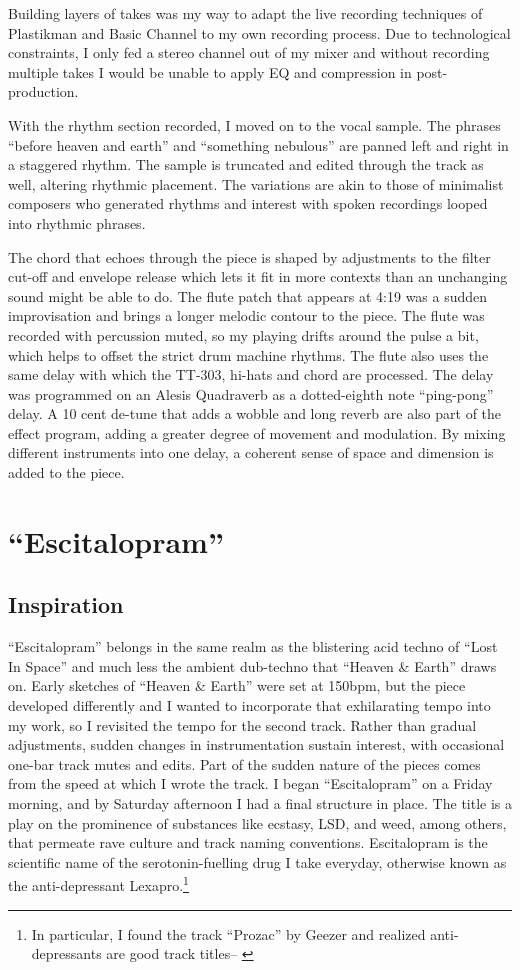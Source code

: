 \documentclass[12pt,twoside]{reedthesis}
\begin{document}
Building layers of takes was my way to adapt the live recording techniques of Plastikman and Basic Channel to my own recording process. Due to technological constraints, I only fed a stereo channel out of my mixer and without recording multiple takes I would be unable to apply EQ and compression in post-production. 

With the rhythm section recorded, I moved on to the vocal sample. The phrases ``before heaven and earth'' and ``something nebulous'' are panned left and right in a staggered rhythm. The sample is truncated and edited through the track as well, altering rhythmic placement. The variations are akin to those of minimalist composers who generated rhythms and interest with spoken recordings looped into rhythmic phrases.

The chord that echoes through the piece is shaped by adjustments to the filter cut-off and envelope release which lets it fit in more contexts than an unchanging sound might be able to do. The flute patch that appears at 4:19 was a sudden improvisation and brings a longer melodic contour to the piece. The flute was recorded with percussion muted, so my playing drifts around the pulse a bit, which helps to offset the strict drum machine rhythms. The flute also uses the same delay with which the TT-303, hi-hats and chord are processed. The delay was programmed on an Alesis Quadraverb as a dotted-eighth note ``ping-pong'' delay. A 10 cent de-tune that adds a wobble and long reverb are also part of the effect program, adding a greater degree of movement and modulation. By mixing different instruments into one delay, a coherent sense of space and dimension is added to the piece. 

\section{``Escitalopram''}

\subsection{Inspiration}

``Escitalopram'' belongs in the same realm as the blistering acid techno of ``Lost In Space'' and much less the ambient dub-techno that ``Heaven {\&} Earth'' draws on. Early sketches of ``Heaven {\&} Earth'' were set at 150bpm, but the piece developed differently and I wanted to incorporate that exhilarating tempo into my work, so I revisited the tempo for the second track. Rather than gradual adjustments, sudden changes in instrumentation sustain interest, with occasional one-bar track mutes and edits. Part of the sudden nature of the pieces comes from the speed at which I wrote the track. I began ``Escitalopram'' on a Friday morning, and by Saturday afternoon I had a final structure in place. The title is a play on the prominence of substances like ecstasy, LSD, and weed, among others, that permeate rave culture and track naming conventions. Escitalopram is the scientific name of the serotonin-fuelling drug I take everyday, otherwise known as the anti-depressant Lexapro.\footnote{In particular, I found the track ``Prozac'' by Geezer and realized anti-depressants are good track titles-- \cite{geezerProzac1996}} 
\end{document}
